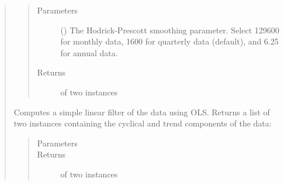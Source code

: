 \documentclass[letterpaper,10pt,openany,oneside,english]{sphinxmanual}
\begin{document}
\begin{fulllineitems}
\begin{quote}
\begin{fulllineitems}
\begin{quote}
\end{quote}
\begin{quote}\begin{description}
\item[{Parameters}] \leavevmode
{} () \textendash{} The Hodrick-Prescott smoothing parameter. Select 129600 for monthly data, 1600 for quarterly data (default), and 6.25 for annual data.

\item[{Returns}] \leavevmode
{} of two {\hyperref[\detokenize{series_class:fredpy.series}]{}} instances

\end{description}\end{quote}

\end{fulllineitems}


\begin{fulllineitems}
\label{\detokenize{series_class:fredpy.series.lintrend}}
Computes a simple linear filter of the data using OLS. Returns a list of two {\hyperref[\detokenize{series_class:fredpy.series}]{}} instances containing the cyclical and trend components of the data:
\begin{quote}

\end{quote}
\begin{quote}\begin{description}
\item[{Parameters}] \leavevmode
\item[{Returns}] \leavevmode
{} of two {\hyperref[\detokenize{series_class:fredpy.series}]{}} instances


\end{description}
\end{quote}
\end{fulllineitems}
\end{quote}
\end{fulllineitems}
\end{document}
